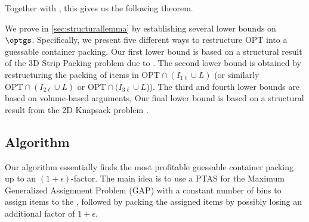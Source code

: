 Together with , this gives us the following theorem.

\begin{theorem}
\end{theorem}
We prove  in \cref{sec:structurallemma} by establishing several lower bounds on $\optgs$. Specifically, we present five different ways to restructure OPT into a guessable container packing. Our first lower bound is based on a structural result of the 3D Strip Packing problem due to \cite{3d-strip-packing}.
The second lower bound is obtained by restructuring the packing of items in $\text{OPT}\cap (I_{1\ell}\cup L)$ (or similarly $\text{OPT}\cap (I_{2\ell}\cup L)$ or $\text{OPT}\cap (I_{3\ell} \cup L$)). The third and fourth lower bounds are based on volume-based arguments,  Our final lower bound is based on a structural result from the 2D Knapsack problem \cite{2dks-Lpacking}.


\iffalse
\subsection{Algorithm}
Our algorithm essentially finds the most profitable guessable container packing up to an $(1+\epsilon)$-factor. The main idea is to use a PTAS for the Maximum Generalized Assignment Problem (GAP) with a constant number of bins to assign items to the \boxes, followed by packing the assigned items by possibly losing an additional factor of $1+\epsilon$.

